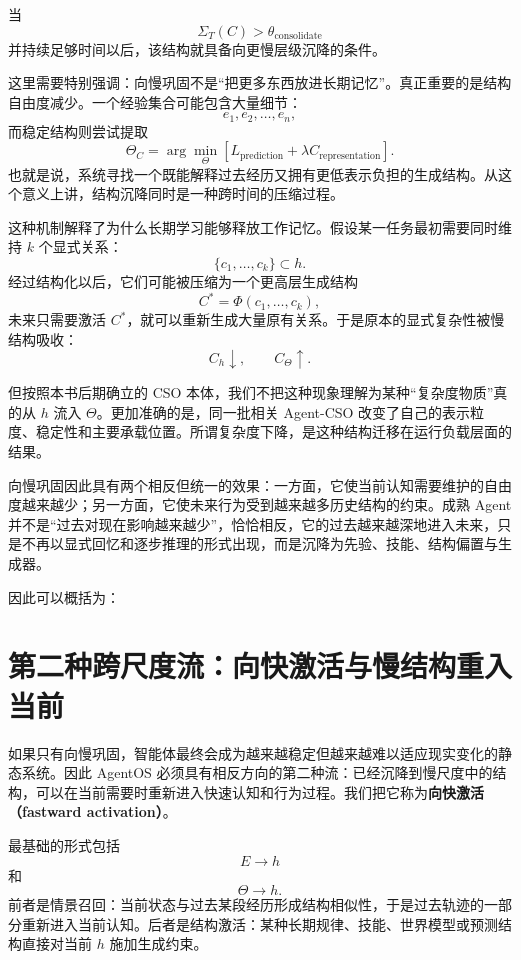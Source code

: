 当
\[
\Sigma_T(C)>\theta_{\mathrm{consolidate}}
\]
并持续足够时间以后，该结构就具备向更慢层级沉降的条件。

这里需要特别强调：向慢巩固不是“把更多东西放进长期记忆”。真正重要的是结构自由度减少。一个经验集合可能包含大量细节：
\[
e_1,e_2,\ldots,e_n,
\]
而稳定结构则尝试提取
\[
\Theta_C
=
\arg\min_{\Theta}
\left[
L_{\mathrm{prediction}}
+
\lambda C_{\mathrm{representation}}
\right].
\]
也就是说，系统寻找一个既能解释过去经历又拥有更低表示负担的生成结构。从这个意义上讲，结构沉降同时是一种跨时间的压缩过程。

这种机制解释了为什么长期学习能够释放工作记忆。假设某一任务最初需要同时维持 $k$ 个显式关系：
\[
\{c_1,\ldots,c_k\}\subset h.
\]
经过结构化以后，它们可能被压缩为一个更高层生成结构
\[
C^*=\Phi(c_1,\ldots,c_k),
\]
未来只需要激活 $C^*$，就可以重新生成大量原有关系。于是原本的显式复杂性被慢结构吸收：
\[
C_h
\downarrow,
\qquad
C_\Theta
\uparrow.
\]

但按照本书后期确立的 CSO 本体，我们不把这种现象理解为某种“复杂度物质”真的从 $h$ 流入 $\Theta$。更加准确的是，同一批相关 Agent-CSO 改变了自己的表示粒度、稳定性和主要承载位置。所谓复杂度下降，是这种结构迁移在运行负载层面的结果。

向慢巩固因此具有两个相反但统一的效果：一方面，它使当前认知需要维护的自由度越来越少；另一方面，它使未来行为受到越来越多历史结构的约束。成熟 Agent 并不是“过去对现在影响越来越少”，恰恰相反，它的过去越来越深地进入未来，只是不再以显式回忆和逐步推理的形式出现，而是沉降为先验、技能、结构偏置与生成器。

因此可以概括为：
\begin{statementbox}
\centering
{}
\end{statementbox}


\section{第二种跨尺度流：向快激活与慢结构重入当前}

如果只有向慢巩固，智能体最终会成为越来越稳定但越来越难以适应现实变化的静态系统。因此 AgentOS 必须具有相反方向的第二种流：已经沉降到慢尺度中的结构，可以在当前需要时重新进入快速认知和行为过程。我们把它称为\textbf{向快激活（fastward activation）}。

最基础的形式包括
\[
E\rightarrow h
\]
和
\[
\Theta\rightarrow h.
\]
前者是情景召回：当前状态与过去某段经历形成结构相似性，于是过去轨迹的一部分重新进入当前认知。后者是结构激活：某种长期规律、技能、世界模型或预测结构直接对当前 $h$ 施加生成约束。

